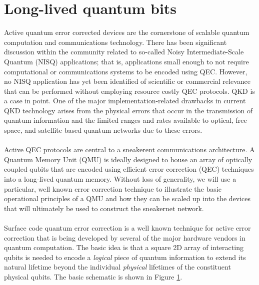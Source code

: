 \documentclass[aps,prl,twocolumn,10pt,nofootinbib]{revtex4}
\begin{document}
\section{Long-lived quantum bits}
Active quantum error corrected devices are the cornerstone of scalable quantum computation and communications technology.  There has been significant discussion within the community related to so-called Noisy Intermediate-Scale Quantum (NISQ) applications; that is, applications small enough to not require computational or communications systems to be encoded using QEC. However, no NISQ application has yet been identified of scientific or commercial relevance that can be performed without employing resource costly QEC protocols.  QKD is a case in point.  One of the major implementation-related drawbacks in current QKD technology arises from the physical errors that occur in the transmission of quantum information and the limited ranges and rates available to optical, free space, and satellite based quantum networks due to these errors.  
\\
\\
Active QEC protocols are central to a sneakerent communications architecture.  A Quantum Memory Unit (QMU) is ideally designed to house an array of optically coupled qubits that are encoded using efficient error correction (QEC) techniques into a long-lived quantum memory.  Without loss of generality, we will use a particular, well known error correction technique to illustrate the basic operational principles of a QMU and how they can be scaled up into the devices that will ultimately be used to construct the sneakernet network.
\\
\\
Surface code quantum error correction is a well known technique for active error correction that is being developed by several of the major hardware vendors in quantum computation.  The basic idea is that a square 2D array of interacting qubits is needed to encode a {\em logical} piece of quantum information to extend its natural lifetime beyond the individual {\em physical} lifetimes of the constituent physical qubits.  The basic schematic is shown in Figure \ref{fig:array}.  

\begin{figure}[ht!]
	\caption{}
	\label{fig:array}
\end{figure}
\end{document}

